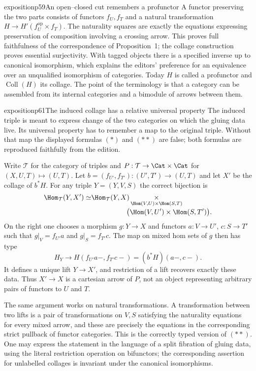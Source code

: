 \begin{dcomment}{exposition}{p59}{An open--closed cut remembers a profunctor}
A functor preserving the two parts consists of functors $f_U,f_T$ and a natural transformation $H\to H'(f_U^{\mathrm{op}}\times f_T)$. The naturality squares are exactly the equations expressing preservation of composition involving a crossing arrow. This proves full faithfulness of the correspondence of Proposition~1; the collage construction proves essential surjectivity. With tagged objects there is a specified inverse up to canonical isomorphism, which explains the editors' preference for an equivalence over an unqualified isomorphism of categories. Today $H$ is called a profunctor and $\operatorname{Coll}(H)$ its collage. The point of the terminology is that a category can be assembled from its internal categories and a bimodule of arrows between them.
\end{dcomment}

\begin{dcomment}{exposition}{p61}{The induced collage has a relative universal property}
The induced triple is meant to express change of the two categories on which the gluing data live. Its universal property has to remember a map to the original triple. Without that map the displayed formulas $(*)$ and $(**)$ are false; both formulas are reproduced faithfully from the edition.

Write $\mathcal T$ for the category of triples and $P:\mathcal T\to\Cat\times\Cat$ for $(X,U,T)\mapsto(U,T)$. Let $b=(f_{U'},f_{T'}):(U',T')\to(U,T)$ and let $X'$ be the collage of $b^*H$. For any triple $Y=(Y,V,S)$ the correct bijection is
\[
\begin{split}
 \Hom_{\mathcal T}(Y,X')\simeq
 &\Hom_{\mathcal T}(Y,X)\mathop{\times}_{
 \Hom(V,U)\times\Hom(S,T)}\\[-2pt]
 &\hspace{18mm}\bigl(\Hom(V,U')\times\Hom(S,T')\bigr).
\end{split}
\]
On the right one chooses a morphism $g:Y\to X$ and functors $a:V\to U'$, $c:S\to T'$ such that $g|_V=f_{U'}a$ and $g|_S=f_{T'}c$. The map on mixed hom sets of $g$ then has type
\[
 H_Y\longrightarrow H(f_{U'}a-,f_{T'}c-)
                 =(b^*H)(a-,c-).
\]
It defines a unique lift $Y\to X'$, and restriction of a lift recovers exactly these data. Thus $X'\to X$ is a cartesian arrow of $P$, not an object representing arbitrary pairs of functors to $U$ and $T$.

The same argument works on natural transformations. A transformation between two lifts is a pair of transformations on $V,S$ satisfying the naturality equations for every mixed arrow, and these are precisely the equations in the corresponding strict pullback of functor categories. This is the correctly typed version of $(**)$. One may express the statement in the language of a split fibration of gluing data, using the literal restriction operation on bifunctors; the corresponding assertion for unlabelled collages is invariant under the canonical isomorphisms.


\end{dcomment}

